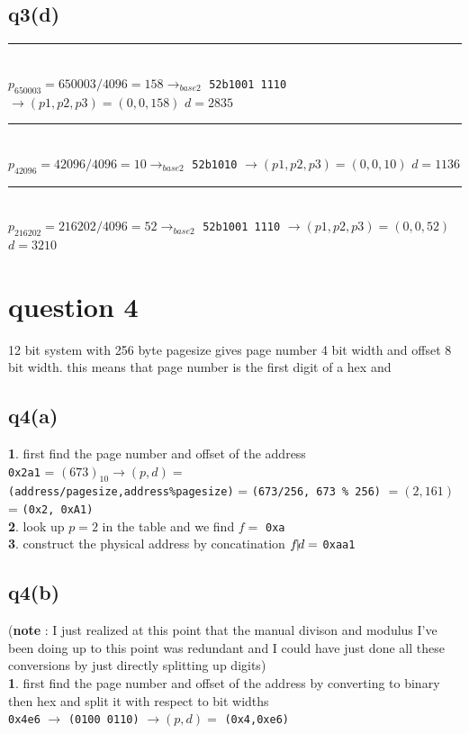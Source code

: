 \documentclass{assignment}
\def\code#1{\texttt{#1}}
\begin{document}
\subsection*{q3(d)}

\noindent\rule{10cm}{1pt} \\
$p_{650003} = 650003 / 4096 = 158 \rightarrow_{base 2}$ \code{52b1001 1110} $\rightarrow (p1,p2,p3) = (0,0,158)$
$d = 2835$ \\
\noindent\rule{10cm}{1pt} \\
$p_{42096} = 42096 / 4096 = 10 \rightarrow_{base 2}$ \code{52b1010}  $\rightarrow (p1,p2,p3) = (0,0,10)$ $d=1136$ \\
\noindent\rule{10cm}{1pt} \\
$p_{216202} = 216202 / 4096 = 52 \rightarrow_{base 2}$ \code{52b1001 1110} $\rightarrow (p1,p2,p3) = (0,0,52)$ $d = 3210$


\section*{question 4}
12 bit system with 256 byte pagesize gives page number 4 bit width and offset 8 bit width. this means that page number is
the first digit of a hex and 
\subsection*{q4(a)}
\textbf{1}. first find the page number and offset of the address \\
\code{0x2a1} = $(673)_{10} \rightarrow (p,d) = $  \\
\code{(address/pagesize,address\%pagesize)} = \code{(673/256, 673 \% 256)} $= (2, 161)$ = \code{(0x2, 0xA1)} \\
\textbf{2}. look up $p=2$ in the table and we find $f = $ \code{0xa} \\ 

\textbf{3}. construct the physical address by concatination $f \vline d =$ \code{0xaa1}  



\subsection*{q4(b)}
(\textbf{note} : I just realized at this point that the manual divison and modulus I've been doing up to this point was redundant and I could have just done all these conversions by just directly splitting up digits) \\
\textbf{1}. first find the page number and offset of the address by converting to binary then hex and split it with respect to bit widths \\
\code{0x4e6} $ \rightarrow$  \code{(0100  0110)} $\rightarrow (p,d) =$ \code{(0x4,0xe6)} \\
\end{document}
